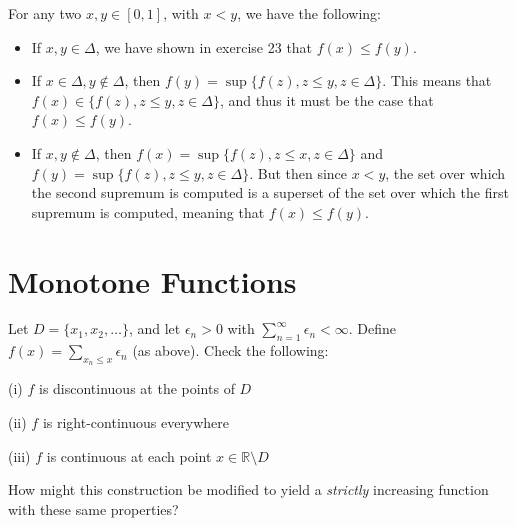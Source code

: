\begin{solution}
    
    For any two $x, y \in [0, 1]$, with $x < y$, we have the following:
    \begin{itemize}
        \item If $x, y \in \Delta$, we have shown in exercise 23 that $f(x) \leq f(y)$.
        \item If $x \in \Delta, y \notin \Delta$, then  $f(y) = \sup\{f(z), z \leq y, z \in \Delta\}$.
        This means that $f(x) \in \{f(z), z \leq y, z \in \Delta\}$, and thus it must be the case that $f(x) \leq f(y)$.
        \item If $x, y \notin \Delta$, then $f(x) = \sup\{f(z), z \leq x, z \in \Delta\}$ and $f(y) = \sup\{f(z), z \leq y, z \in \Delta\}$.
        But then since $x < y$, the set over which the second supremum is computed is a superset of the set over which the first supremum is computed, meaning that $f(x) \leq f(y)$.
    \end{itemize}
\end{solution}

\section{Monotone Functions}

\begin{exercise}{34}
    Let $D = \{x_1, x_2, \ldots\}$, and let $\epsilon_n > 0$ with $\sum_{n=1}^{\infty} \epsilon_n < \infty$.
    Define $f(x) = \sum_{x_n \leq x} \epsilon_n$ (as above).
    Check the following:
    
    (i) $f$ is discontinuous at the points of $D$

    (ii) $f$ is right-continuous everywhere

    (iii) $f$ is continuous at each point $x \in \mathbb{R} \setminus D$

    How might this construction be modified to yield a \textit{strictly} increasing function with these same properties?
\end{exercise}

